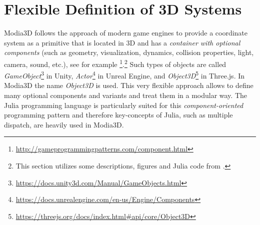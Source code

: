\section{Flexible Definition of 3D Systems}

Modia3D follows the approach of modern game engines to provide
a coordinate system as a primitive that is located in 3D and has a 
\textit{container with optional components} (such as geometry, visualization, dynamics, 
collision properties, light, camera, sound, etc.), see for example \cite{Nystrom2014}\footnote{\href{http://gameprogrammingpatterns.com/component.html}{http://gameprogrammingpatterns.com/component.html}}.\footnote{This section utilizes some descriptions, figures and Julia
code from \cite{Neumayr2018}.}
Such types of objects are called
\emph{GameObject}\footnote{\href{https://docs.unity3d.com/Manual/GameObjects.html}{https://docs.unity3d.com/Manual/GameObjects.html}} in Unity,
\emph{Actor}\footnote{\href{https://docs.unrealengine.com/en-us/Engine/Components}{https://docs.unrealengine.com/en-us/Engine/Components}} in Unreal Engine, and
\emph{Object3D}\footnote{\href{https://threejs.org/docs/index.html\#api/core/Object3D}{https://threejs.org/docs/index.html\#api/core/Object3D}} in Three.js. 
In Modia3D the name \emph{Object3D} is used. This very flexible approach allows to define many optional components and variants and treat them in a modular way. The Julia programming language is particularly suited for this \textit{component-oriented} programming pattern and therefore key-concepts of Julia, such as multiple dispatch, are heavily used in Modia3D. 
	
